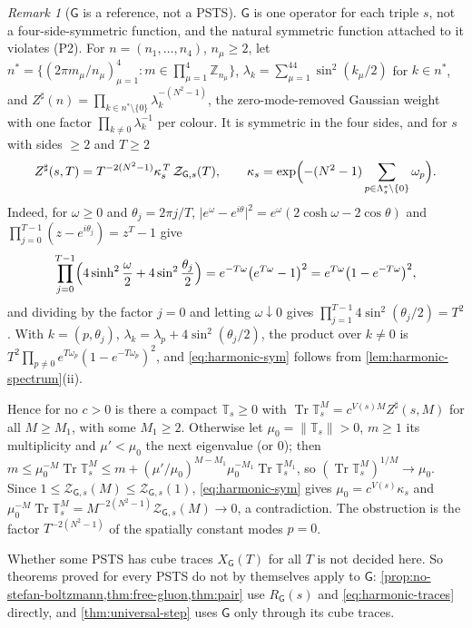 \documentclass[11pt,a4paper]{amsart}
\theoremstyle{definition}
\theoremstyle{remark}
\newtheorem{remark}[theorem]{Remark}
\numberwithin{equation}{section}
\DeclareMathOperator{\Tr}{Tr}        %
\newcommand{\Z}{\mathbb{Z}}          %
\newcommand{\norm}[1]{\lVert #1\rVert}     %
\newcommand{\abs}[1]{\lvert #1\rvert}      %
\newcommand{\PSTS}{\textup{PSTS}}          %
\newcommand{\TT}{\mathbb{T}}               %
\newcommand{\Zc}{\mathcal{Z}}              %
\newcommand{\Zs}[2]{\Zc_{#1}(#2)}          %
\newcommand{\XT}[2]{X_{#1}(#2)}            %
\newcommand{\Vol}[1]{V(#1)}                %
\newcommand{\Gharm}{\mathsf{G}}            %
\begin{document}
\begin{remark}[$\Gharm$ is a reference, not a \PSTS]\label{rem:harmonic-not-psts}
$\Gharm$ is one operator for each triple $s$, not a four-side-symmetric function, and the natural symmetric function attached to it violates (P2). For $n=(n_1,\dots,n_4)$, $n_\mu\ge2$, let $n^*=\{(2\pi m_\mu/n_\mu)_{\mu=1}^4:m\in\prod_{\mu=1}^4\Z_{n_\mu}\}$, $\lambda_k=\sum_{\mu=1}^44\sin^2(k_\mu/2)$ for $k\in n^*$, and $Z^\sharp(n)=\prod_{k\in n^*\setminus\{0\}}\lambda_k^{-(N^2-1)}$, the zero-mode-removed Gaussian weight with one factor $\prod_{k\ne0}\lambda_k^{-1}$ per colour. It is symmetric in the four sides, and for $s$ with sides $\ge2$ and $T\ge2$
\begin{equation}\label{eq:harmonic-sym}
 Z^\sharp(s,T)=T^{-2(N^2-1)}\kappa_s^{\,T}\,\Zs{\Gharm,s}{T},\qquad \kappa_s=\exp\Bigl(-(N^2-1)\sum_{p\in\Lambda_s^*\setminus\{0\}}\omega_p\Bigr).
\end{equation}
Indeed, for $\omega\ge0$ and $\theta_j=2\pi j/T$, $\abs{e^\omega-e^{i\theta}}^2=e^\omega(2\cosh\omega-2\cos\theta)$ and $\prod_{j=0}^{T-1}(z-e^{i\theta_j})=z^T-1$ give
\[
 \prod_{j=0}^{T-1}\Bigl(4\sinh^2\frac\omega2+4\sin^2\frac{\theta_j}2\Bigr)=e^{-T\omega}\bigl(e^{T\omega}-1\bigr)^2=e^{T\omega}\bigl(1-e^{-T\omega}\bigr)^2,
\]
and dividing by the factor $j=0$ and letting $\omega\downarrow0$ gives $\prod_{j=1}^{T-1}4\sin^2(\theta_j/2)=T^2$. With $k=(p,\theta_j)$, $\lambda_k=\lambda_p+4\sin^2(\theta_j/2)$, the product over $k\ne0$ is $T^2\prod_{p\ne0}e^{T\omega_p}(1-e^{-T\omega_p})^2$, and \eqref{eq:harmonic-sym} follows from \cref{lem:harmonic-spectrum}(ii).

Hence for no $c>0$ is there a compact $\TT_s\ge0$ with $\Tr\TT_s^M=c^{\Vol{s}M}Z^\sharp(s,M)$ for all $M\ge M_1$, with some $M_1\ge2$. Otherwise let $\mu_0=\norm{\TT_s}>0$, $m\ge1$ its multiplicity and $\mu'<\mu_0$ the next eigenvalue (or $0$); then $m\le\mu_0^{-M}\Tr\TT_s^M\le m+(\mu'/\mu_0)^{M-M_1}\mu_0^{-M_1}\Tr\TT_s^{M_1}$, so $(\Tr\TT_s^M)^{1/M}\to\mu_0$. Since $1\le\Zs{\Gharm,s}{M}\le\Zs{\Gharm,s}{1}$, \eqref{eq:harmonic-sym} gives $\mu_0=c^{\Vol{s}}\kappa_s$ and $\mu_0^{-M}\Tr\TT_s^M=M^{-2(N^2-1)}\Zs{\Gharm,s}{M}\to0$, a contradiction. The obstruction is the factor $T^{-2(N^2-1)}$ of the spatially constant modes $p=0$.

Whether some \PSTS{} has cube traces $\XT{\Gharm}{T}$ for all $T$ is not decided here. So theorems proved for every \PSTS{} do not by themselves apply to $\Gharm$: \cref{prop:no-stefan-boltzmann,thm:free-gluon,thm:pair} use $R_{\Gharm}(s)$ and \eqref{eq:harmonic-traces} directly, and \cref{thm:universal-step} uses $\Gharm$ only through its cube traces.
\end{remark}
\end{document}
